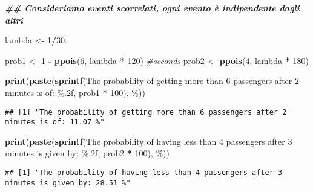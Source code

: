 \documentclass[
]{article}
\newenvironment{Shaded}{\begin{snugshade}}{\end{snugshade}}
\newcommand{\CommentTok}[1]{\textcolor[rgb]{0.56,0.35,0.01}{\textit{#1}}}
\newcommand{\DecValTok}[1]{\textcolor[rgb]{0.00,0.00,0.81}{#1}}
\newcommand{\DocumentationTok}[1]{\textcolor[rgb]{0.56,0.35,0.01}{\textbf{\textit{#1}}}}
\newcommand{\FloatTok}[1]{\textcolor[rgb]{0.00,0.00,0.81}{#1}}
\newcommand{\FunctionTok}[1]{\textcolor[rgb]{0.13,0.29,0.53}{\textbf{#1}}}
\newcommand{\NormalTok}[1]{#1}
\newcommand{\OtherTok}[1]{\textcolor[rgb]{0.56,0.35,0.01}{#1}}
\newcommand{\SpecialCharTok}[1]{\textcolor[rgb]{0.81,0.36,0.00}{\textbf{#1}}}
\newcommand{\StringTok}[1]{\textcolor[rgb]{0.31,0.60,0.02}{#1}}
\begin{document}
\begin{Shaded}
\begin{Highlighting}[]
\DocumentationTok{\#\# Consideriamo eventi scorrelati, ogni evento è indipendente dagli altri }

\NormalTok{lambda }\OtherTok{\textless{}{-}} \DecValTok{1}\SpecialCharTok{/}\FloatTok{30.}

\NormalTok{prob1 }\OtherTok{\textless{}{-}} \DecValTok{1} \SpecialCharTok{{-}} \FunctionTok{ppois}\NormalTok{(}\DecValTok{6}\NormalTok{, lambda }\SpecialCharTok{*} \DecValTok{120}\NormalTok{) }\CommentTok{\#seconds}
\NormalTok{prob2 }\OtherTok{\textless{}{-}} \FunctionTok{ppois}\NormalTok{(}\DecValTok{4}\NormalTok{, lambda }\SpecialCharTok{*} \DecValTok{180}\NormalTok{)}

\FunctionTok{print}\NormalTok{(}\FunctionTok{paste}\NormalTok{(}\FunctionTok{sprintf}\NormalTok{(}\StringTok{\textquotesingle{}The probability of getting more than 6 passengers after 2 minutes is of: \%.2f\textquotesingle{}}\NormalTok{, prob1 }\SpecialCharTok{*} \DecValTok{100}\NormalTok{), }\StringTok{\textquotesingle{}\%\textquotesingle{}}\NormalTok{))}
\end{Highlighting}
\end{Shaded}

\begin{verbatim}
## [1] "The probability of getting more than 6 passengers after 2 minutes is of: 11.07 %"
\end{verbatim}

\begin{Shaded}
\begin{Highlighting}[]
\FunctionTok{print}\NormalTok{(}\FunctionTok{paste}\NormalTok{(}\FunctionTok{sprintf}\NormalTok{(}\StringTok{\textquotesingle{}The probability of having less than 4 passengers after 3 minutes is given by: \%.2f\textquotesingle{}}\NormalTok{, prob2 }\SpecialCharTok{*} \DecValTok{100}\NormalTok{), }\StringTok{\textquotesingle{}\%\textquotesingle{}}\NormalTok{))}
\end{Highlighting}
\end{Shaded}

\begin{verbatim}
## [1] "The probability of having less than 4 passengers after 3 minutes is given by: 28.51 %"
\end{verbatim}
\end{document}
